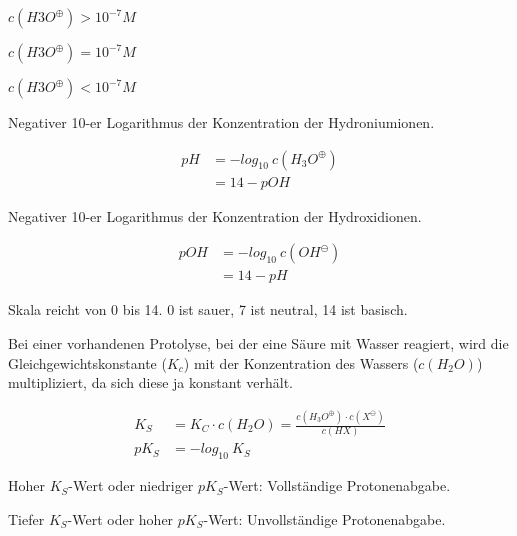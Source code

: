 \begin{definition}
	{\large
		$c(H3O^\oplus) > 10^{-7} M$
	}
\end{definition}

\begin{definition}
	{\large
		$c(H3O^\oplus) = 10^{-7} M$
	}
\end{definition}

\begin{definition}
	{\large
		$c(H3O^\oplus) < 10^{-7} M$
	}
\end{definition}

\begin{definition}[pH-Wert]
	Negativer 10-er Logarithmus der Konzentration der Hydroniumionen.
	
	{\large
		\begin{equation}
			\begin{split}
				pH		&=-log_{10}\ c(H_3O^\oplus) \\
						  &= 14-pOH
			\end{split}
		\end{equation}
	}
\end{definition}

\begin{definition}
	Negativer 10-er Logarithmus der Konzentration der Hydroxidionen.
	
	{\large
		\begin{equation}
			\begin{split}
				pOH&=-log_{10}\ c(OH^\ominus) \\
				&=14-pH
			\end{split}
		\end{equation}
	}
\end{definition}

Skala reicht von 0 bis 14. 0 ist sauer, 7 ist neutral, 14 ist basisch.

\begin{definition}[Säurekonstante]
	Bei einer vorhandenen Protolyse, bei der eine Säure mit Wasser reagiert, wird die Gleichgewichtskonstante ($K_c$) mit der Konzentration des Wassers ($c(H_2O)$) multipliziert, da sich diese ja konstant verhält.
	
	{\large
		\begin{equation}
		\begin{split}
		K_S & =K_C \cdot c(H_2O) = \frac{c(H_3O^\oplus) \cdot c(X^\ominus)}{c(HX)} \\
		pK_S & = -log_{10}\ K_S
		\end{split}
		\end{equation}
	}
	
	Hoher $K_S$-Wert oder niedriger $pK_S$-Wert: Vollständige Protonenabgabe.
	
	Tiefer $K_S$-Wert oder hoher $pK_S$-Wert: Unvollständige Protonenabgabe.
\end{definition}


